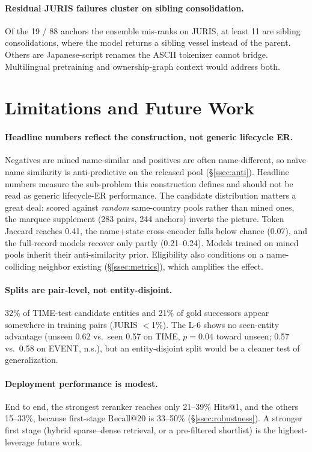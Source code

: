 \documentclass[sigconf]{acmart}
\begin{document}
\paragraph{Residual JURIS failures cluster on sibling
consolidation.} Of the 19 / 88 anchors the ensemble mis-ranks on
JURIS, at least 11 are sibling consolidations, where the model
returns a sibling vessel instead of the parent. Others are
Japanese-script renames the ASCII tokenizer cannot bridge. Multilingual
pretraining and ownership-graph context would address both.


\section{Limitations and Future Work}
\label{sec:limitations}

\paragraph{Headline numbers reflect the construction, not generic
lifecycle ER\@.} Negatives are mined name-similar and positives are
often name-different, so naive name similarity is anti-predictive on
the released pool (\S\ref{ssec:anti}). Headline numbers measure the
sub-problem this construction defines and should not be read as
generic lifecycle-ER performance. The candidate distribution matters
a great deal: scored against \emph{random} same-country pools rather
than mined ones, the marquee supplement (283 pairs, 244 anchors)
inverts the picture. Token Jaccard reaches 0.41, the name+state
cross-encoder falls below chance (0.07), and the full-record models
recover only partly (0.21--0.24). Models trained on mined pools
inherit their anti-similarity prior. Eligibility also conditions on
a name-colliding neighbor existing (\S\ref{ssec:metrics}), which
amplifies the effect.

\paragraph{Splits are pair-level, not entity-disjoint.} 32\% of
TIME-test candidate entities and 21\% of gold successors appear
somewhere in training pairs (JURIS $<$1\%). The L-6 shows no
seen-entity advantage (unseen 0.62 vs.\ seen 0.57 on TIME,
$p{=}0.04$ toward unseen; 0.57 vs.\ 0.58 on EVENT, n.s.), but an
entity-disjoint split would be a cleaner test of generalization.

\paragraph{Deployment performance is modest.} End to end, the
strongest reranker reaches only 21--39\% Hits@1, and the others
15--33\%, because first-stage Recall@20 is 33--50\%
(\S\ref{ssec:robustness}). A stronger first stage (hybrid
sparse--dense retrieval, or a pre-filtered shortlist) is the
highest-leverage future work.
\end{document}
